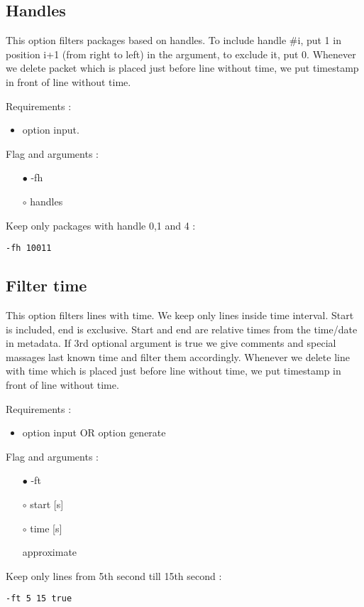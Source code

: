 \documentclass[english]{article}
\begin{document}
\subsection{Handles}
This option filters packages based on handles. To include handle \#i, put 1 in position i+1 (from right to left) in the argument, to exclude it, put 0. Whenever we delete packet which is placed just before line without time, we put timestamp in front of line without time.

\noindent Requirements : 
\begin{itemize}
\item option input. 
\end{itemize}
Flag and arguments :
\begin{itemize}
\item[$\bullet$] -fh
\item[$\circ$] handles
\end{itemize}
Keep only packages with handle 0,1 and 4 : 
\begin{lstlisting} 
-fh 10011
\end{lstlisting}


\subsection{Filter time}
This option filters lines with time. We keep only lines inside time interval. Start is included, end is exclusive. Start and end are relative times from the time/date in metadata. If 3rd optional argument is true we give comments and special massages last known time and filter them accordingly.  Whenever we delete line with time which is placed just before line without time, we put timestamp in front of line without time.

\noindent Requirements : 
\begin{itemize}
\item option input OR option generate
\end{itemize}
Flag and arguments :
\begin{itemize}
\item[$\bullet$] -ft
\item[$\circ$] start [s]
\item[$\circ$] time [s]
\item[\textasteriskcentered] approximate
\end{itemize}
Keep only lines from 5th second till 15th second : 
\begin{lstlisting} 
-ft 5 15 true
\end{lstlisting}
\end{document}
